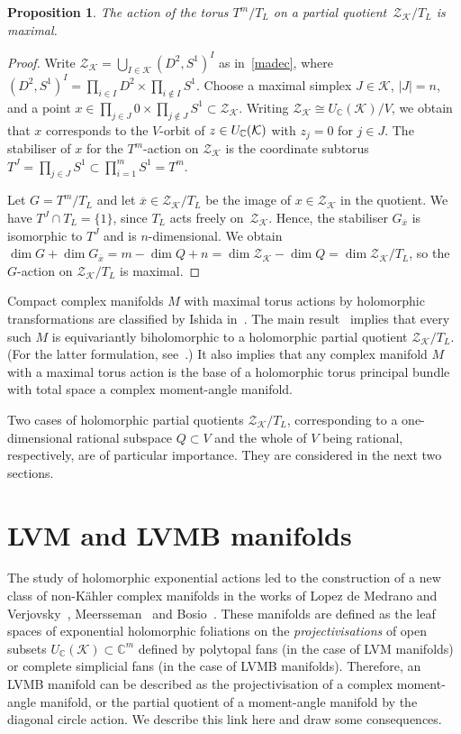 \documentclass[a4paper]{amsart}
\newtheorem{proposition}[theorem]{Proposition}
\theoremstyle{definition}
\theoremstyle{remark}
\numberwithin{equation}{section}
\def\C{\mathbb C}
\def\sK{\mathcal K}
\newcommand{\mb}[1]{{\textbf {\textit#1}}}
\newcommand{\zk}{\mathcal Z_{\mathcal K}}
\newcommand{\<}{\langle}
\renewcommand{\>}{\rangle}
\begin{document}
\begin{proposition}
The action of the torus $T^m/T_L$ on a partial quotient~$\zk/T_L$ is maximal.
\end{proposition}
\begin{proof}
Write $\zk=\bigcup_{I\in\sK}(D^2,S^1)^I$ as in~\eqref{madec}, where 
$(D^2,S^1)^I=\prod_{i\in I}D^2\times\prod_{i\notin I}S^1$. Choose a maximal simplex $J\in\sK$, $|J|=n$, and a point $x\in\prod_{j\in J}0\times\prod_{j\notin J}S^1\subset\zk$. Writing $\zk\cong U_\C(\sK)/V$, we obtain that $x$ corresponds to the $V$-orbit of $\mb z\in U_\C(\sK)$ with $z_j=0$ for $j\in J$. The stabiliser of $x$ for the $T^m$-action on $\zk$ is the coordinate subtorus $T^J=\prod_{j\in J} S^1\subset \prod_{i=1}^m S^1= T^m$.

Let $G=T^m/T_L$ and let $\overline x\in\zk/T_L$ be the image of $x\in\zk$ in the quotient. We have $T^J\cap T_L=\{1\}$, since $T_L$ acts freely 
on~$\zk$. Hence, the stabiliser $G_{\overline x}$ is isomorphic to $T^J$ and is $n$-dimensional. We obtain $\dim G+\dim G_{\overline x}=m-\dim Q+n=\dim\zk-\dim Q=\dim\zk/T_L$, so the $G$-action on $\zk/T_L$ is maximal.
\end{proof}

Compact complex manifolds $M$ with maximal torus actions by holomorphic transformations are classified by Ishida in~\cite{ishi19}. The main result~\cite[Theorem~1.5]{ishi19} implies that every such $M$ is equivariantly biholomorphic to a holomorphic partial quotient $\zk/T_L$. (For the latter formulation, see~\cite[Theorem~4.8]{usti14}.) It also implies that any complex manifold $M$ with a maximal torus action is the base of a holomorphic torus principal bundle with total space a complex moment-angle manifold.

\smallskip

Two cases of holomorphic partial quotients $\zk/T_L$, corresponding to a one-dimensional rational subspace $Q\subset V$ and the whole of $V$ being rational, respectively, are of particular importance. They are considered in the next two sections.


\section{LVM and LVMB manifolds}\label{LVMBsec}
The study of holomorphic exponential actions led to the construction of a new class of non-K\"ahler complex manifolds in the works of Lopez de Medrano and Verjovsky~\cite{lo-ve97}, Meersseman~\cite{meer00} and Bosio~\cite{bosi01}. These manifolds are defined as the leaf spaces of exponential holomorphic foliations on the \emph{projectivisations} of open subsets $U_\C(\sK)\subset\C^m$ defined by polytopal fans (in the case of LVM manifolds) or complete simplicial fans (in the case of LVMB manifolds). Therefore, an LVMB manifold can be described as the projectivisation of a complex moment-angle manifold, or the partial quotient of a moment-angle manifold by the diagonal circle action. We describe this link here and draw some consequences.
\end{document}

